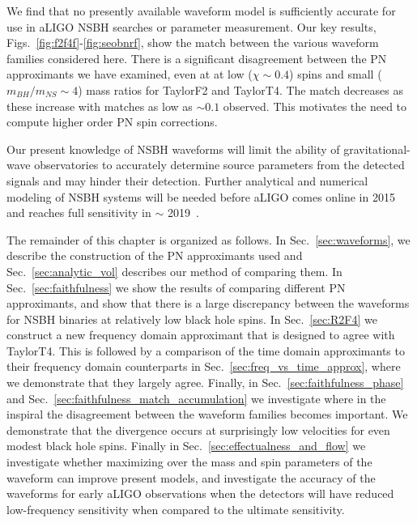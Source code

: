 We find that no presently available waveform model is sufficiently accurate for use
in \ac{aLIGO} \ac{NSBH} searches or parameter measurement. Our key results, Figs.~\ref{fig:f2f4f}-\ref{fig:seobnrf},
show the match between the various waveform families considered here.
There is a significant disagreement between the \ac{PN} approximants we
have examined, even at at low ($\chi \sim 0.4$) spins and small ($m_{BH}/m_{NS} \sim 4$) mass ratios for TaylorF2 and TaylorT4.
The match decreases as these increase with matches as low as $\sim 0.1$ observed. This motivates
the need to compute higher order \ac{PN} spin corrections.  

Our present knowledge of \ac{NSBH} waveforms will limit the
ability of gravitational-wave observatories to accurately determine source
parameters from the detected signals and may hinder their detection.
Further analytical and numerical modeling of \ac{NSBH} systems will be needed
before \ac{aLIGO} comes online in 2015 and reaches full sensitivity in $\sim$
2019~\cite{Aasi:2013wya}.

The remainder of this chapter is organized as follows.  In
Sec.~\ref{sec:waveforms}, we describe the construction of the \ac{PN}
approximants used and Sec.~\ref{sec:analytic_vol} describes our
method of comparing them.  In Sec.~\ref{sec:faithfulness} we show the results
of comparing different \ac{PN} approximants, and show that there is a large
discrepancy between the waveforms for \ac{NSBH} binaries at relatively low
black hole spins. In Sec.~\ref{sec:R2F4} we construct a new frequency domain
approximant that is designed to agree with TaylorT4. This is followed by a
comparison of the time domain approximants to their frequency domain
counterparts in Sec.~\ref{sec:freq_vs_time_approx}, where we demonstrate that
they largely agree. Finally, in Sec.~\ref{sec:faithfulness_phase} and
Sec.~\ref{sec:faithfulness_match_accumulation} we investigate where in the
inspiral the disagreement between the waveform families becomes important. We
demonstrate that the divergence occurs at surprisingly low velocities for even
modest black hole spins. Finally in Sec.~\ref{sec:effectualness_and_flow} we
investigate whether maximizing over the mass and spin parameters of the
waveform can improve present models, and investigate the accuracy of the
waveforms for early aLIGO observations when the detectors will have reduced
low-frequency sensitivity when compared to the ultimate sensitivity. 



